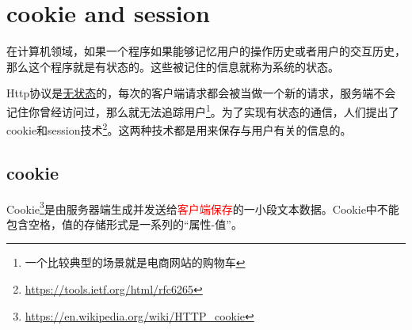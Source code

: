 \chapter{cookie and session}

在计算机领域，如果一个程序如果能够记忆用户的操作历史或者用户的交互历史，那么这个程序就是有状态的。这些被记住的信息就称为系统的状态。

Http协议是\underline{无状态}的，每次的客户端请求都会被当做一个新的请求，服务端不会记住你曾经访问过，那么就无法追踪用户\footnote{一个比较典型的场景就是电商网站的购物车}。为了实现有状态的通信，人们提出了cookie和session技术\footnote{\url{https://tools.ietf.org/html/rfc6265}}。这两种技术都是用来保存与用户有关的信息的。

\section{cookie}
\label{ck}
Cookie\footnote{\url{https://en.wikipedia.org/wiki/HTTP_cookie}}是由服务器端生成并发送给\textcolor{red}{客户端保存}的一小段文本数据。Cookie中不能包含空格，值的存储形式是一系列的“属性-值”。

